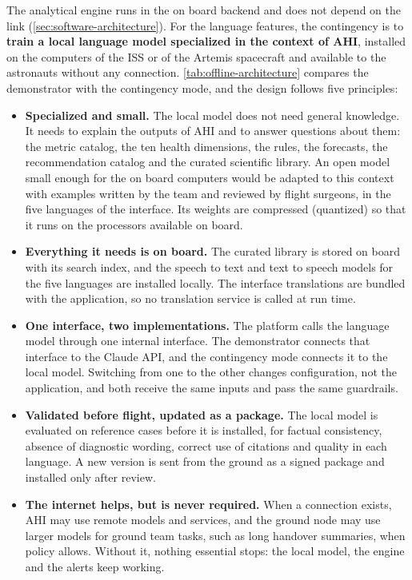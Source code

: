 The analytical engine runs in the on board backend and does not depend on the link (\ref{sec:software-architecture}). For the language features, the contingency is to \textbf{train a local language model specialized in the context of AHI}, installed on the computers of the ISS or of the Artemis spacecraft and available to the astronauts without any connection. \ref{tab:offline-architecture} compares the demonstrator with the contingency mode, and the design follows five principles:

\begin{itemize}
\item \textbf{Specialized and small.} The local model does not need general knowledge. It needs to explain the outputs of AHI and to answer questions about them: the metric catalog, the ten health dimensions, the rules, the forecasts, the recommendation catalog and the curated scientific library. An open model small enough for the on board computers would be adapted to this context with examples written by the team and reviewed by flight surgeons, in the five languages of the interface. Its weights are compressed (quantized) so that it runs on the processors available on board.
\item \textbf{Everything it needs is on board.} The curated library is stored on board with its search index, and the speech to text and text to speech models for the five languages are installed locally. The interface translations are bundled with the application, so no translation service is called at run time.
\item \textbf{One interface, two implementations.} The platform calls the language model through one internal interface. The demonstrator connects that interface to the Claude API, and the contingency mode connects it to the local model. Switching from one to the other changes configuration, not the application, and both receive the same inputs and pass the same guardrails.
\item \textbf{Validated before flight, updated as a package.} The local model is evaluated on reference cases before it is installed, for factual consistency, absence of diagnostic wording, correct use of citations and quality in each language. A new version is sent from the ground as a signed package and installed only after review.
\item \textbf{The internet helps, but is never required.} When a connection exists, AHI may use remote models and services, and the ground node may use larger models for ground team tasks, such as long handover summaries, when policy allows. Without it, nothing essential stops: the local model, the engine and the alerts keep working.
\end{itemize}

